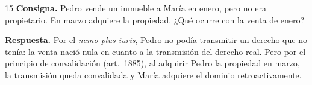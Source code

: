 \documentclass[12pt,oneside]{book}
\begin{document}
\begin{ejercicio}{15}
\textbf{Consigna.} Pedro vende un inmueble a María en enero, pero no era propietario. En marzo adquiere la propiedad. ¿Qué ocurre con la venta de enero?

\textbf{Respuesta.} Por el \textit{nemo plus iuris}, Pedro no podía transmitir un derecho que no tenía: la venta nació nula en cuanto a la transmisión del derecho real. Pero por el principio de convalidación (art.~1885), al adquirir Pedro la propiedad en marzo, la transmisión queda convalidada y María adquiere el dominio retroactivamente.
\end{ejercicio}
\end{document}
